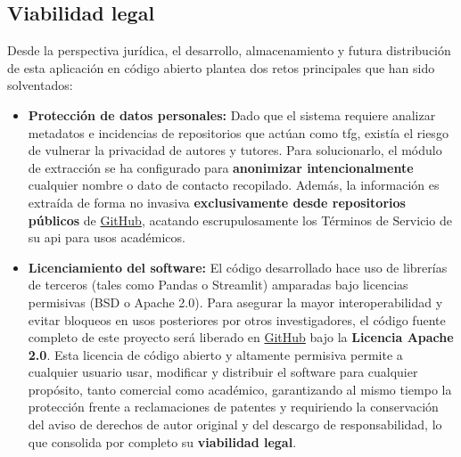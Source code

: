 \subsection{Viabilidad legal}
Desde la perspectiva jurídica, el desarrollo, almacenamiento y futura
distribución de esta aplicación en código abierto plantea dos retos principales
que han sido solventados:

\begin{itemize}
    \item \textbf{Protección de datos personales:} Dado que el sistema requiere analizar metadatos e incidencias de repositorios que actúan como \acrshort{tfg}, existía el riesgo de vulnerar la privacidad de autores y tutores. Para solucionarlo, el módulo de extracción se ha configurado para \textbf{anonimizar intencionalmente} cualquier nombre o dato de contacto recopilado. Además, la información es extraída de forma no invasiva \textbf{exclusivamente desde repositorios públicos} de \href{https://github.com}{GitHub}, acatando escrupulosamente los Términos de Servicio de su \acrshort{api} para usos académicos.
    \item \textbf{Licenciamiento del software:} El código desarrollado hace uso de librerías de terceros (tales como Pandas o Streamlit) amparadas bajo licencias permisivas (BSD o Apache 2.0). Para asegurar la mayor interoperabilidad y evitar bloqueos en usos posteriores por otros investigadores, el código fuente completo de este proyecto será liberado en \href{https://github.com/zcc1001/tfg-topics}{GitHub} bajo la \textbf{Licencia Apache 2.0}. Esta licencia de código abierto y altamente permisiva permite a cualquier usuario usar, modificar y distribuir el software para cualquier propósito, tanto comercial como académico, garantizando al mismo tiempo la protección frente a reclamaciones de patentes y requiriendo la conservación del aviso de derechos de autor original y del descargo de responsabilidad, lo que consolida por completo su \textbf{viabilidad legal}.
\end{itemize}


